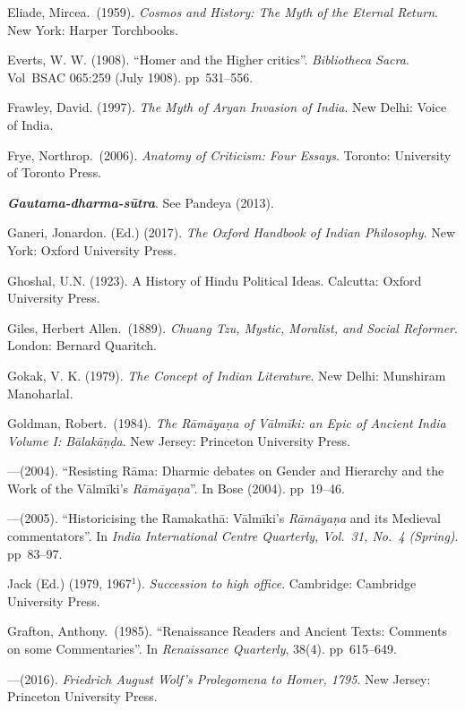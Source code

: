 \begin{thebibliography}{99}
Eliade, Mircea.\ (1959). {\sl Cosmos and History: The Myth of the Eternal Return}. New York: Harper Torchbooks. 

Everts, W. W. (1908). “Homer and the Higher critics”. {\sl Bibliotheca Sacra}. Vol BSAC 065:259 (July 1908). pp~531--556. 

Frawley, David. (1997). {\sl The Myth of Aryan Invasion of India}.  New Delhi: Voice of India. 

Frye, Northrop.\ (2006). {\sl Anatomy of Criticism: Four Essays}. Toronto: University of Toronto Press. 

{\sl\bfseries Gautama-dharma-sūtra}. See Pandeya (2013). 

Ganeri, Jonardon. (Ed.) (2017). {\sl The Oxford Handbook of Indian Philosophy}. New York: Oxford University Press. 

Ghoshal, U.N. (1923). A History of Hindu Political Ideas. Calcutta: Oxford University Press. 

Giles, Herbert Allen.\ (1889). {\sl Chuang Tzu, Mystic, Moralist, and Social Reformer}. London: Bernard Quaritch. 

Gokak, V. K.  (1979). {\sl The Concept of Indian Literature}. New Delhi: Munshiram Manoharlal. 

Goldman, Robert.\ (1984). {\sl The Rāmāyaṇa of Vālmīki: an Epic of Ancient India Volume I: Bālakāṇḍa}. New Jersey: Princeton University Press. 

---\kern3pt(2004). “Resisting Rāma: Dharmic debates on Gender and Hierarchy and the Work of the Vālmīki’s {\sl Rāmāyaṇa}”. In Bose (2004). pp~19--46. 

---\kern3pt(2005). “Historicising the Ramakathā: Vālmīki's {\sl Rāmāyaṇa} and its Medieval commentators”. In {\sl India International Centre Quarterly, Vol.~31, No.~4 (Spring)}. pp~83--97.

Jack (Ed.) (1979, 1967$^{1}$). {\sl Succession to high office}. Cambridge: Cambridge University Press. 

Grafton, Anthony.\ (1985). “Renaissance Readers and Ancient Texts: Comments on some Commentaries”. In {\sl Renaissance Quarterly}, 38(4). pp~615--649.

---\kern3pt(2016). {\sl Friedrich August Wolf’s Prolegomena to Homer, 1795}.  New Jersey: Princeton University Press. 


\end{thebibliography}
